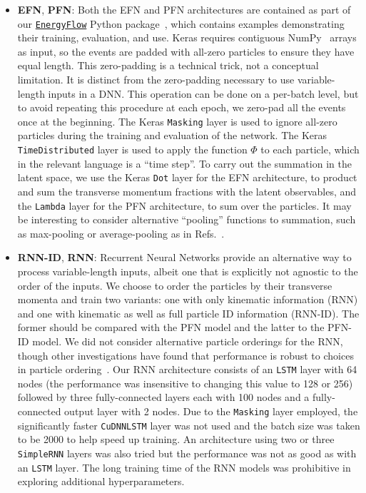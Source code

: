 \documentclass[letterpaper,11pt]{article}
\DeclareRobustCommand{\Refs}[1]{Refs.~\cite{#1}}
\begin{document}
\begin{itemize}

\item \textbf{EFN}, \textbf{PFN}: Both the EFN and PFN architectures are contained as part of our \href{https://energyflow.network}{\tt EnergyFlow} Python package~\cite{energyflow}, which contains examples demonstrating their training, evaluation, and use.
%
Keras requires contiguous NumPy~\cite{numpy} arrays as input, so the events are padded with all-zero particles to ensure they have equal length.
%
This zero-padding is a technical trick, not a conceptual limitation.  It is distinct from the zero-padding necessary to use variable-length inputs in a DNN.
%
This operation can be done on a per-batch level, but to avoid repeating this procedure at each epoch, we zero-pad all the events once at the beginning.
%
The Keras {\tt Masking} layer is used to ignore all-zero particles during the training and evaluation of the network.
%
The Keras {\tt TimeDistributed} layer is used to apply the function $\Phi$ to each particle, which in the relevant language is a ``time step''.
%
To carry out the summation in the latent space, we use the Keras {\tt Dot} layer for the EFN architecture, to product and sum the transverse momentum fractions with the latent observables, and the {\tt Lambda} layer for the PFN architecture, to sum over the particles.
%
It may be interesting to consider alternative ``pooling'' functions to summation, such as max-pooling or average-pooling as in \Refs{DBLP:journals/corr/abs-1709-03019,DBLP:conf/cvpr/QiSMG17}. 


\item \textbf{RNN-ID}, \textbf{RNN}: Recurrent Neural Networks provide an alternative way to process variable-length inputs, albeit one that is explicitly not agnostic to the order of the inputs.
%
We choose to order the particles by their transverse momenta and train two variants: one with only kinematic information (RNN) and one with kinematic as well as full particle ID information (RNN-ID).
%
The former should be compared with the PFN model and the latter to the PFN-ID model.
%
We did not consider alternative particle orderings for the RNN, though other investigations have found that performance is robust to choices in particle ordering~\cite{Louppe:2017ipp,Andreassen:2018apy}.
%
Our RNN architecture consists of an {\tt LSTM} layer with 64 nodes (the performance was insensitive to changing this value to 128 or 256) followed by three fully-connected layers each with 100 nodes and a fully-connected output layer with 2 nodes. 
%
Due to the {\tt Masking} layer employed, the significantly faster {\tt CuDNNLSTM} layer was not used and the batch size was taken to be 2000 to help speed up training.
%
An architecture using two or three {\tt SimpleRNN} layers was also tried but the performance was not as good as with an {\tt LSTM} layer.
%
The long training time of the RNN models was prohibitive in exploring additional hyperparameters.




\end{itemize}
\end{document}

